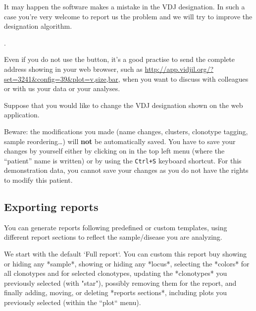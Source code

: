 \bigskip

It may happen the software makes a mistake in the VDJ designation.
In such a case you're very welcome to report us the problem
and we will try to improve the designation algorithm.

.

Even if you do not use the  button, it's a good practise
to send the complete address showing in your web browser, such
as  \url{http://app.vidjil.org/?set=3241&config=39&plot=v,size,bar},
when you want to discuss with colleagues or with us your data or your analyses.

\bigskip

Suppose that you would like to change the VDJ designation shown on the web application.

Beware: the modifications you made (name changes, clusters, clonotype
tagging, sample reordering\dots) will \textbf{not} be automatically saved. You have to save
your changes by yourself either by clicking on  in the top left menu (where the
``patient'' name is written) or by using the \texttt{Ctrl+S} keyboard
shortcut.
For this demonstration data, you cannot save your changes as you do not have
the rights to modify this patient.

\subsection{Exporting reports}

You can generate reports following predefined or custom templates, using different report sections
to reflect the sample/disease you are analyzing.


We start with the default `Full report`.
You can custom this report buy showing or hiding any *sample*,
showing or hiding any *locus*, selecting the *colors* for all clonotypes and for selected clonotypes,
updating the *clonotypes* you previously selected (with "star"),  possibly removing them for the report,
and finally adding, moving, or deleting *reports sections*, including plots you previously selected (within the “plot“ menu).

